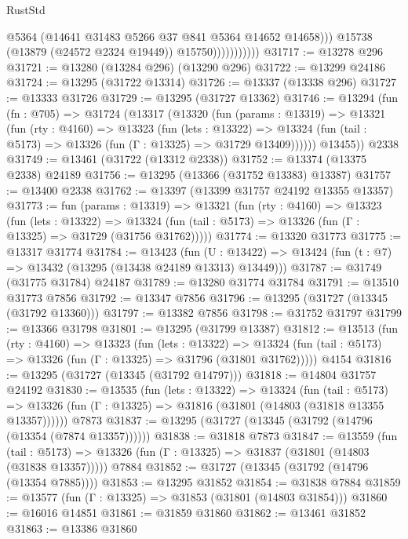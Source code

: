 \begin{lexlean}{RustStd}
\begin{coremodule}
                              @5364
                              (@14641 @31483 @5266 @37 @841 @5364 @14652 @14658)))
                          @15738
                          (@13879 (@24572 @2324 @19449))
                          @15750)))))))))))
@31717 := @13278 @296
@31721 := @13280 (@13284 @296) (@13290 @296)
@31722 := @13299 @24186
@31724 := @13295 (@31722 @13314)
@31726 := @13337 (@13338 @296)
@31727 := @13333 @31726
@31729 := @13295 (@31727 @13362)
@31746 := @13294
    (fun (fn : @705) =>
    @31724
      (@13317
        (@13320
          (fun (params : @13319) =>
          @13321
            (fun (rty : @4160) =>
            @13323
              (fun (lets : @13322) =>
              @13324 (fun (tail : @5173) => @13326 (fun (Γ : @13325) => @31729 @13409))))))
        @13455))
    @2338
@31749 := @13461 (@31722 (@13312 @2338))
@31752 := @13374 (@13375 @2338) @24189
@31756 := @13295 (@13366 (@31752 @13383) @13387)
@31757 := @13400 @2338
@31762 := @13397 (@13399 @31757 @24192 @13355 @13357)
@31773 := fun (params : @13319) =>
  @13321
    (fun (rty : @4160) =>
    @13323
      (fun (lets : @13322) =>
      @13324 (fun (tail : @5173) => @13326 (fun (Γ : @13325) => @31729 (@31756 @31762)))))
@31774 := @13320 @31773
@31775 := @13317 @31774
@31784 := @13423
    (fun (U : @13422) => @13424 (fun (t : @7) => @13432 (@13295 (@13438 @24189 @13313) @13449)))
@31787 := @31749 (@31775 @31784) @24187
@31789 := @13280 @31774 @31784
@31791 := @13510 @31773 @7856
@31792 := @13347 @7856
@31796 := @13295 (@31727 (@13345 (@31792 @13360)))
@31797 := @13382 @7856
@31798 := @31752 @31797
@31799 := @13366 @31798
@31801 := @13295 (@31799 @13387)
@31812 := @13513
    (fun (rty : @4160) =>
    @13323
      (fun (lets : @13322) =>
      @13324 (fun (tail : @5173) => @13326 (fun (Γ : @13325) => @31796 (@31801 @31762)))))
    @4154
@31816 := @13295 (@31727 (@13345 (@31792 @14797)))
@31818 := @14804 @31757 @24192
@31830 := @13535
    (fun (lets : @13322) =>
    @13324
      (fun (tail : @5173) =>
      @13326 (fun (Γ : @13325) => @31816 (@31801 (@14803 (@31818 @13355 @13357))))))
    @7873
@31837 := @13295 (@31727 (@13345 (@31792 (@14796 (@13354 (@7874 @13357))))))
@31838 := @31818 @7873
@31847 := @13559
    (fun (tail : @5173) => @13326 (fun (Γ : @13325) => @31837 (@31801 (@14803 (@31838 @13357)))))
    @7884
@31852 := @31727 (@13345 (@31792 (@14796 (@13354 @7885))))
@31853 := @13295 @31852
@31854 := @31838 @7884
@31859 := @13577 (fun (Γ : @13325) => @31853 (@31801 (@14803 @31854)))
@31860 := @16016 @14851
@31861 := @31859 @31860
@31862 := @13461 @31852
@31863 := @13386 @31860

\end{coremodule}
\end{lexlean}
